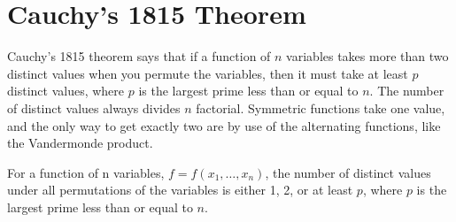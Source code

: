 \section{Cauchy's 1815 Theorem}

Cauchy's 1815 theorem says that if a function of $n$ variables takes more than two distinct values when you permute the variables, then it must take at least $p$ distinct values, where $p$ is the largest prime less than or equal to $n$. 
The number of distinct values always divides $n$ factorial. Symmetric functions take one value, and the only way to get exactly two are by use of the alternating functions, like the Vandermonde product.

\begin{theorem} For a function of n variables, $f=f(x_1,\hdots,x_n)$, the number of distinct values under all permutations of the variables is either 1, 2, or at least $p$, where $p$ is the largest prime less than or equal to $n$. 
\end{theorem}
